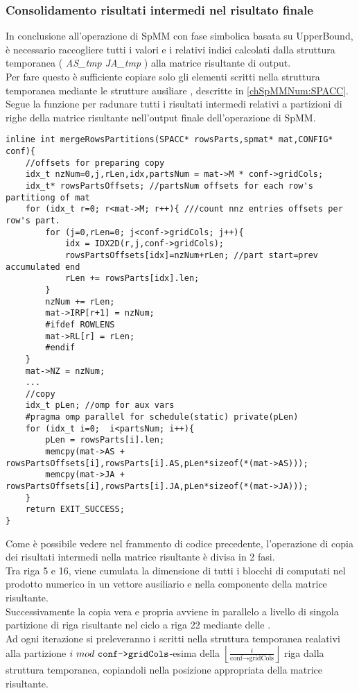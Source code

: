 \subsubsection{Consolidamento risultati intermedi nel risultato finale} \label{chSpMMNum:mergeRows}
In conclusione all'operazione di SpMM con fase simbolica basata su UpperBound, 
è necessario raccogliere tutti i valori \nnz e i relativi indici calcolati 
dalla struttura temporanea ( \emph{AS\_tmp JA\_tmp} ) alla matrice risultante di output.\\
Per fare questo è sufficiente copiare solo gli elementi \nnz scritti nella struttura temporanea
mediante le strutture ausiliare , descritte in \ref{chSpMMNum:SPACC}.\\
Segue la funzione per radunare tutti i risultati intermedi relativi a partizioni di righe della matrice 
risultante nell'output finale dell'operazione di SpMM.\\
\begin{lstlisting}
inline int mergeRowsPartitions(SPACC* rowsParts,spmat* mat,CONFIG* conf){
	//offsets for preparing copy 
    idx_t nzNum=0,j,rLen,idx,partsNum = mat->M * conf->gridCols;
    idx_t* rowsPartsOffsets; //partsNum offsets for each row's partitiong of mat
    for (idx_t r=0; r<mat->M; r++){	///count nnz entries offsets per row's part.
        for (j=0,rLen=0; j<conf->gridCols; j++){
            idx = IDX2D(r,j,conf->gridCols);
            rowsPartsOffsets[idx]=nzNum+rLen; //part start=prev accumulated end
            rLen += rowsParts[idx].len;
        }
        nzNum += rLen;
        mat->IRP[r+1] = nzNum;
		#ifdef ROWLENS
        mat->RL[r] = rLen;
		#endif
    }
    mat->NZ = nzNum;
	...
	//copy
    idx_t pLen; //omp for aux vars
    #pragma omp parallel for schedule(static) private(pLen)
    for (idx_t i=0;  i<partsNum; i++){
        pLen = rowsParts[i].len;
        memcpy(mat->AS + rowsPartsOffsets[i],rowsParts[i].AS,pLen*sizeof(*(mat->AS)));
        memcpy(mat->JA + rowsPartsOffsets[i],rowsParts[i].JA,pLen*sizeof(*(mat->JA)));
    }
    return EXIT_SUCCESS;
}
\end{lstlisting}
Come è possibile vedere nel frammento di codice precedente, l'operazione di copia dei risultati
intermedi nella matrice risultante è divisa in 2 fasi.\\
Tra riga 5 e 16, viene cumulata la dimensione di tutti i blocchi di \nnz computati
nel prodotto numerico in un vettore ausiliario  e nella componente 
 della matrice risultante.\\
Successivamente la copia vera e propria avviene in parallelo 
a livello di singola partizione di riga risultante nel ciclo a riga 22 mediante delle .\\
Ad ogni iterazione si preleveranno i \nnz scritti nella struttura temporanea realativi
alla partizione $i~mod~ \verb|conf->gridCols|$-esima della $\left\lfloor \frac{i}{\text{conf} \rightarrow \text{gridCols}} \right\rfloor$
riga dalla struttura temporanea, copiandoli nella posizione appropriata della matrice risultante.\\



